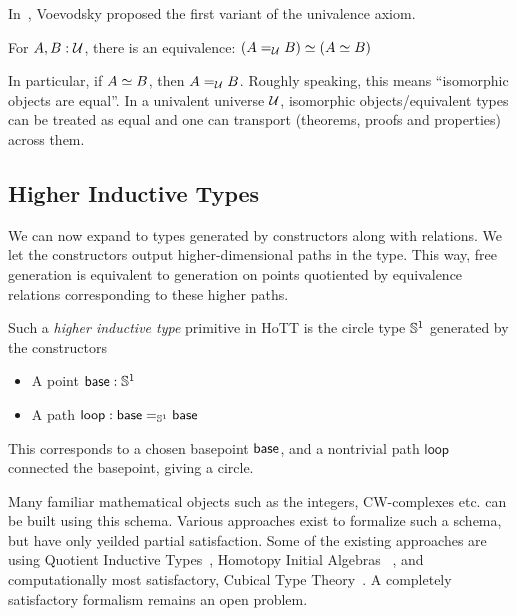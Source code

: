 In~\cite{voevodsky2014equivalence}, Voevodsky proposed the first variant of the univalence axiom.
\begin{axiom}[Univalence]
  For $A, B : \mathcal{U}$, there is an equivalence:
  $(A =_{\mathcal{U}} B) \simeq (A \simeq B) $
\end{axiom}
In particular, if $A \simeq B$, then $A =_{\mathcal{U}} B$.
Roughly speaking, this means ``isomorphic objects are equal''. 
In a univalent universe $\mathcal{U}$, isomorphic objects/equivalent types can be treated as equal and one can transport 
(theorems, proofs and properties) across them.

\subsection{Higher Inductive Types}

We can now expand to types generated by constructors along with relations.
We let the constructors output higher-dimensional paths in the type. This way, 
free generation is equivalent to generation on points quotiented by equivalence relations corresponding to these higher paths.

Such a \textit{higher inductive type} primitive in HoTT is the circle type $\mathbb{S}^1$ generated by the constructors
\begin{itemize}
  \item A point $\mathsf{base} : \mathbb{S}^1$
  \item A path $ \mathsf{loop} : \mathsf{base} =_{\mathbb{S}^1} \mathsf{base} $
\end{itemize}
This corresponds to a chosen basepoint $\mathsf{base}$, and a nontrivial path $\mathsf{loop}$ connected the basepoint,
giving a circle.

Many familiar mathematical objects such as the integers, CW-complexes etc. can be built using
this schema. Various approaches exist to formalize such a schema, but have only yeilded partial satisfaction. 
Some of the existing approaches are using Quotient Inductive Types~\cite{altenkirch2016type}, Homotopy Initial Algebras~\cite{sojakova2015higher} , and computationally
most satisfactory, Cubical Type Theory~\cite{cohen2016cubical, cavallo2021higher}. A completely satisfactory formalism remains an open problem.
